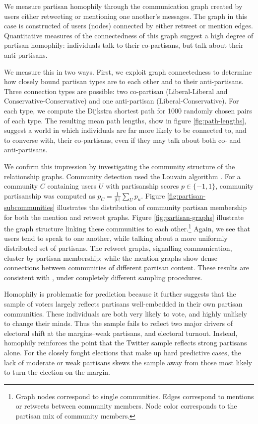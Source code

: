 \documentclass{article}
\begin{document}
We measure partisan homophily through the communication graph created
by users either retweeting or mentioning one another's messages. The
graph in this case is constructed of users (nodes) connected by either
retweet or mention edges. Quantitative measures of the connectedness
of this graph suggest a high degree of partisan homophily: individuals
talk to their co-partisans, but talk about their anti-partisans.

We measure this in two ways. First, we exploit graph connectedness to
determine how closely bound partisan types are to each other and to
their anti-partisans. Three connection types are possible: two
co-partisan (Liberal-Liberal and Conservative-Conservative) and one
anti-partisan (Liberal-Conservative). For each type, we compute the
Dijkstra shortest path for 1000 randomly chosen pairs of each
type. The resulting mean path lengths, show in figure
\ref{fig:path-lengths}, suggest a world in which individuals are far
more likely to be connected to, and to converse with, their
co-partisans, even if they may talk about both co- and anti-partisans.

We confirm this impression by investigating the community structure of
the relationship graphs. Community detection used the Louvain
algorithm \citep{blondel2008fast}. For a community $C$ containing
users $U$ with partisanship scores $p \in \{-1, 1\}$, community partisanship was computed
as $p_C = \frac{1}{\left|U\right|}\sum_U p_u$. Figure
\ref{fig:partisan-subcommunities} 
illustrates the distribution of community partisan membership
for both the mention and retweet graphs. Figure \ref{fig:partisan-graphs}
 illustrate the graph
structure linking these communities to each other.\footnote{Graph
  nodes correspond to single communities. Edges correspond to mentions
or retweets between community members. Node color corresponds to the
partisan mix of community members.} Again, we see that users tend
to speak to one another, while talking about a more uniformly
distributed set of partisans. The retweet graphs, signalling
communication, cluster by partisan membership; while the mention
graphs show dense connections between communities of different
partisan content. These results are consistent with
\cite{conover2011}, under completely different sampling procedures. 

Homophily is problematic for prediction because it further suggests
that the sample of voters largely reflects partisans well-embedded in
their own partisan communities. These individuals are both very likely
to vote, and highly unlikely to change their minds. Thus the sample
fails to reflect two major drivers of electoral shift at the
margins--weak partisans, and electoral turnout. Instead, homophily
reinforces the point that the Twitter sample reflects strong partisans
alone. For the closely fought elections that make up hard predictive
cases, the lack of moderate or weak partisans skews the sample away
from those most likely to turn the election on the margin. 
\end{document}
